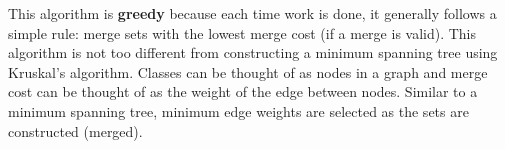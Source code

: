 \documentclass[11pt, oneside]{article}   	%
\begin{document}
This algorithm is {\bf greedy} because each time work is done, it generally follows a simple rule: merge sets with the lowest merge cost (if a merge is valid). This algorithm is not too different from constructing a minimum spanning tree using Kruskal's algorithm. Classes can be thought of as nodes in a graph and merge cost can be thought of as the weight of the edge between nodes. Similar to a minimum spanning tree, minimum edge weights are selected as the sets are constructed (merged). 
\end{document}
